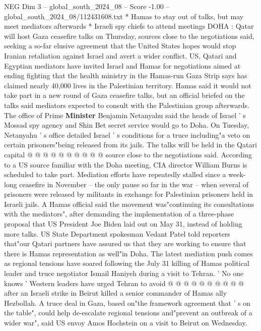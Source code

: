\begin{textsample}{NEG Dim 3 – global\_south\_2024\_08 – Score -1.00 – global\_south\_2024\_08/112431608.txt}  \label{ex:f3_neg_159}
* Hamas to stay out of talks, but may meet mediators afterwards * Israeli spy chiefs to attend meetings DOHA : Qatar will host Gaza ceasefire talks on Thursday, sources close to the negotiations said, seeking a so-far elusive agreement that the United States hopes would stop Iranian retaliation against Israel and avert a wider conflict.
US, Qatari and Egyptian mediators have invited Israel and Hamas for negotiations aimed at ending fighting that the health ministry in the Hamas-run Gaza Strip says has claimed nearly 40,000 lives in the Palestinian territory.
Hamas said it would not take part in a new round of Gaza ceasefire talks, but an official briefed on the talks said mediators expected to consult with the Palestinian group afterwards.
The office of Prime \textbf{Minister} Benjamin Netanyahu said the heads of Israel ' s Mossad spy agency and Shin Bet secret service would go to Doha.
On Tuesday, Netanyahu ' s office detailed Israel ' s conditions for a truce including"a veto on certain prisoners"being released from its jails.
The talks will be held in the Qatari capital @ @ @ @ @ @ @ @ @ @ source close to the negotiations said.
According to a US source familiar with the Doha meeting, CIA director William Burns is scheduled to take part.
Mediation efforts have repeatedly stalled since a week-long ceasefire in November -- the only pause so far in the war -- when several of prisoners were released by militants in exchange for Palestinian prisoners held in Israeli jails.
A Hamas official said the movement was"continuing its consultations with the mediators", after demanding the implementation of a three-phase proposal that US President Joe Biden laid out on May 31, instead of holding more talks.
US State Department spokesman Vedant Patel told reporters that"our Qatari partners have assured us that they are working to ensure that there is Hamas representation as well"in Doha.
The latest mediation push comes as regional tensions have soared following the July 31 killing of Hamas political leader and truce negotiator Ismail Haniyeh during a visit to Tehran. ' No one knows ' Western leaders have urged Tehran to avoid @ @ @ @ @ @ @ @ @ @ after an Israeli strike in Beirut killed a senior commander of Hamas ally Hezbollah.
A truce deal in Gaza, based on"the framework agreement that ' s on the table", could help de-escalate regional tensions and"prevent an outbreak of a wider war", said US envoy Amos Hochstein on a visit to Beirut on Wednesday.

\end{textsample}
